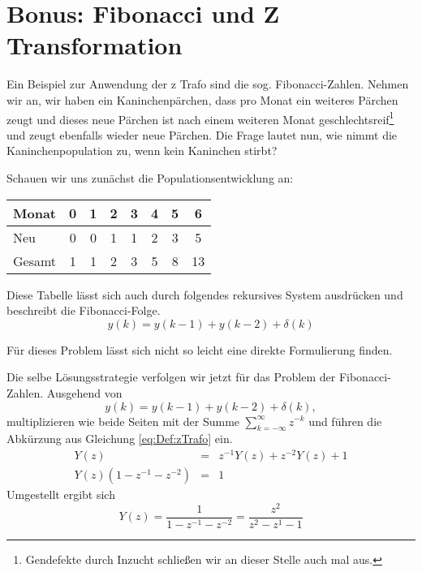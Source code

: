 \section{Bonus: Fibonacci und Z Transformation}
Ein Beispiel zur Anwendung der z Trafo sind die sog. Fibonacci-Zahlen. Nehmen wir an, wir haben
ein Kaninchenpärchen, dass pro Monat ein weiteres Pärchen zeugt
und dieses neue Pärchen ist nach einem weiteren Monat
geschlechtsreif\footnote{Gendefekte durch Inzucht schließen wir an
dieser Stelle auch mal aus.} und zeugt ebenfalls wieder neue
Pärchen. Die Frage lautet nun, wie nimmt die Kaninchenpopulation
zu, wenn kein Kaninchen stirbt?

Schauen wir uns zunächst die Populationsentwicklung an:

\begin{center}
\begin{tabular}{l|c|c|c|c|c|c|c|}
Monat  & 0 & 1 & 2 & 3 & 4 & 5 & 6  \\\hline

Neu    & 0 & 0 & 1 & 1 & 2 & 3 & 5 \\\hline

Gesamt & 1 & 1 & 2 & 3 & 5 & 8 & 13 \\\hline
\end{tabular}
\end{center}

Diese Tabelle lässt sich auch durch folgendes rekursives System
ausdrücken und beschreibt die Fibonacci-Folge.
\begin{equation}
    y(k) = y(k-1)+y(k-2) + \delta(k)
\end{equation}

Für dieses Problem lässt sich nicht so leicht eine direkte
Formulierung finden. 


Die selbe Lösungsstrategie verfolgen wir jetzt für das Problem der
Fibonacci-Zahlen. Ausgehend von
\begin{equation}\label{eq:example2:FiboStart}
y(k) = y(k-1) + y(k-2) + \delta(k),
\end{equation}
multiplizieren wie beide Seiten mit der Summe $\sum_{k =
	-\infty}^{\infty}z^{-k}$ und führen die Abkürzung aus Gleichung
\ref{eq:Def:zTrafo} ein.
\begin{eqnarray}\label{eq:example2}
Y(z) &=& z^{-1}Y(z) + z^{-2}Y(z) + 1 \\
Y(z)\left(1- z^{-1} -z^{-2} \right) &=& 1
\end{eqnarray}
Umgestellt ergibt sich
\begin{equation}\label{eq:example2:zLoesung1}
Y(z) = \frac{1}{1-z^{-1} - z^{-2}} = \frac{z^{2}}{z^{2} - z^{1} -1}
\end{equation}

